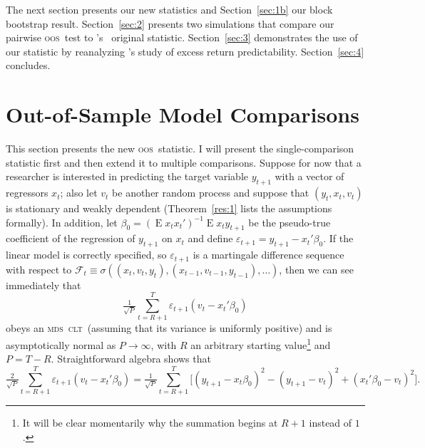 \documentclass[11pt,fleqn]{article}
\newcommand\citepos[2][]{\citeauthor{#2}'s \citeyearpar[#1]{#2}}
\newcommand\poscw{\citeauthor{ClW:06}'s \citeyearpar{ClW:06,ClW:07}}
\theoremstyle{definition}
\DeclareMathOperator{\E}{E}
\newcommand{\clt}{\textsc{clt}}
\newcommand{\mds}{\textsc{mds}}
\newcommand{\oos}{\textsc{oos}}
\begin{document}
The next section presents our new statistics and Section~\ref{sec:1b}
our block bootstrap result.  Section~\ref{sec:2} presents two
simulations that compare our pairwise \oos\ test to \poscw\ original
statistic.  Section~\ref{sec:3} demonstrates the use of our statistic
by reanalyzing \citepos{GoW:08} study of excess return
predictability. Section~\ref{sec:4} concludes.

\section{Out-of-Sample Model Comparisons}\label{sec:1}
This section presents the new \oos\ statistic.  I will present the
single-comparison statistic first and then extend it to multiple
comparisons.  Suppose for now that a researcher is interested in
predicting the target variable $y_{t+1}$ with a vector of regressors
$x_t$; also let $v_t$ be another random process and suppose that
$(y_t, x_t, v_t)$ is stationary and weakly dependent
(Theorem~\ref{res:1} lists the assumptions formally).  In addition,
let $\beta_0 = (\E x_t x_t')^{-1} \E x_t y_{t+1}$ be the pseudo-true
coefficient of the regression of $y_{t+1}$ on $x_t$ and define
$\varepsilon_{t+1} = y_{t+1} - x_t'\beta_0$.  If the linear model is
correctly specified, so $\varepsilon_{t+1}$ is a martingale difference
sequence with respect to $\mathcal{F}_t \equiv \sigma((x_t, v_t, y_t),
(x_{t-1}, v_{t-1}, y_{t-1}),\dots)$, then we can see immediately that
\begin{equation}
  \label{eq:4}
  \tfrac{1}{\sqrt{P}} \sum_{t=R+1}^T \varepsilon_{t+1} (v_t - x_t'\beta_0)
\end{equation}
obeys an \mds\ \clt\ (assuming that its variance is uniformly
positive) and is asymptotically normal as $P \to \infty$, with $R$ an
arbitrary starting value\footnote{It will be clear momentarily why the
  summation begins at $R+1$ instead of $1$.} and $P = T - R$.
Straightforward algebra \citep{ClW:07} shows that
\begin{equation}
  \label{eq:5}
  \tfrac{2}{\sqrt{P}} \sum_{t=R+1}^T \varepsilon_{t+1} (v_t -
  x_t'\beta_0) = \tfrac{1}{\sqrt{P}} \sum_{t=R+1}^T \Big[(y_{t+1} - 
  x_t\beta_0)^2 - (y_{t+1} - v_t)^2 + (x_t'\beta_0 - v_t)^2 \Big].
\end{equation}
\end{document}
